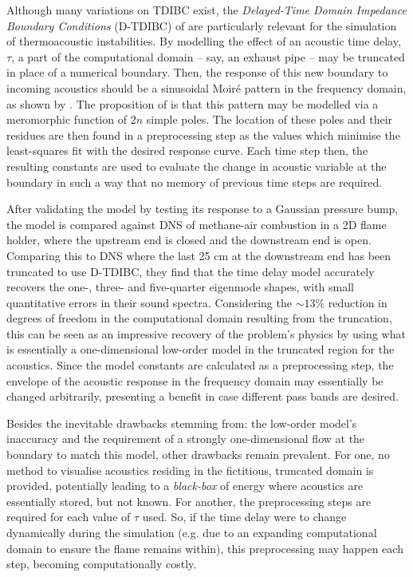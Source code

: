 Although many variations on TDIBC exist, the \emph{Delayed-Time Domain Impedance Boundary Conditions} (D-TDIBC) of \cite{douasbin2018DelayedtimeDomainImpedance} are particularly relevant for the simulation of thermoacoustic instabilities. By modelling the effect of an acoustic time delay, $τ$, a part of the computational domain -- say, an exhaust pipe -- may be truncated in place of a numerical boundary. Then, the response of this new boundary to incoming acoustics should be a sinusoidal Moiré pattern in the frequency domain, as shown by . The proposition of \cite{douasbin2018DelayedtimeDomainImpedance} is that this pattern may be modelled via a meromorphic function of $2n$ simple poles. The location of these poles and their residues are then found in a preprocessing step as the values which minimise the least-squares fit with the desired response curve. Each time step then, the resulting constants are used to evaluate the change in acoustic variable at the boundary in such a way that no memory of previous time steps are required. 

After validating the model by testing its response to a Gaussian pressure bump, the model is compared against DNS of methane-air combustion in a 2D flame holder, where the upstream end is closed and the downstream end is open. Comparing this to DNS where the last 25 cm at the downstream end has been truncated to use D-TDIBC, they find that the time delay model accurately recovers the one-, three- and five-quarter eigenmode shapes, with small quantitative errors in their sound spectra. Considering the $\sim 13\%$ reduction in degrees of freedom in the computational domain resulting from the truncation, this can be seen as an impressive recovery of the problem's physics by using what is essentially a one-dimensional low-order model in the truncated region for the acoustics. Since the model constants are calculated as a preprocessing step, the envelope of the acoustic response in the frequency domain may essentially be changed arbitrarily, presenting a benefit in case different pass bands are desired.

Besides the inevitable drawbacks stemming from: the low-order model's inaccuracy and the requirement of a strongly one-dimensional flow at the boundary to match this model, other drawbacks remain prevalent. For one, no method to visualise acoustics residing in the fictitious, truncated domain is provided, potentially leading to a \emph{black-box} of energy where acoustics are essentially stored, but not known. For another, the preprocessing steps are required for each value of $τ$ used. So, if the time delay were to change dynamically during the simulation (e.g. due to an expanding computational domain to ensure the flame remains within), this preprocessing may happen each step, becoming computationally costly.





